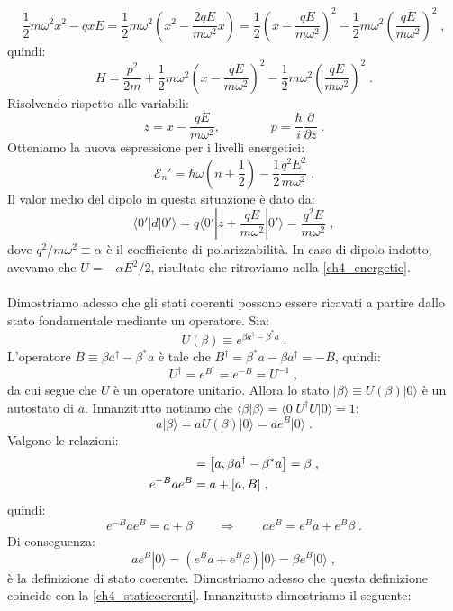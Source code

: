 \documentclass[10pt,a4paper]{report}
\theoremstyle{definition}
\numberwithin{equation}{section}
\newcommand{\bra}{\langle}
\newcommand{\ket}{\rangle}
\newcommand{\adj}[1]{#1^{\dagger}}
\begin{document}
$$
\frac{1}{2}m\omega^2 x^2-qxE=\frac{1}{2}m\omega^2\left(x^2-\frac{2qE}{m\omega^2}x\right)=\frac{1}{2}\left(x-\frac{qE}{m\omega^2}\right)^2-\frac{1}{2}m\omega^2\left(\frac{qE}{m\omega^2}\right)^2\;,
$$
quindi:
\begin{equation}
H=\frac{p^2}{2m}+\frac{1}{2}m\omega^2\left(x-\frac{qE}{m\omega^2}\right)^2-\frac{1}{2}m\omega^2\left(\frac{qE}{m\omega^2}\right)^2\;.
\end{equation}
Risolvendo rispetto alle variabili:
$$
z=x-\frac{qE}{m\omega^2},\qquad\qquad p=\frac{\hbar}{i}\frac{\partial}{\partial z}\;.
$$
Otteniamo la nuova espressione per i livelli energetici:
\begin{equation}
\mathcal{E}_n'=\hbar\omega\left(n+\frac{1}{2}\right)-\frac{1}{2}\frac{q^2E^2}{m\omega^2}\;. \label{ch4_energetic}
\end{equation}
Il valor medio del dipolo in questa situazione è dato da:
\begin{equation}
\bra 0'|d|0'\ket=q\bra 0'|z+\frac{qE}{m\omega^2}|0'\ket=\frac{q^2E}{m\omega^2}\;,
\end{equation}
dove $q^2/m\omega^2\equiv \alpha$ è il coefficiente di polarizzabilità. In caso di dipolo indotto, avevamo che $U=-\alpha E^2/2$, risultato che ritroviamo nella \eqref{ch4_energetic}. \\
\\
Dimostriamo adesso che gli stati coerenti possono essere ricavati a partire dallo stato fondamentale mediante un operatore. Sia:
\begin{equation}
U(\beta)\equiv e^{\beta\adj{a}-\beta^*a}\;.
\end{equation}
L'operatore $B\equiv \beta\adj{a}-\beta^*a$ è tale che $\adj{B}=\beta^*a-\beta\adj{a}=-B$, quindi:
$$
\adj{U}=e^{\adj{B}}=e^{-B}=U^{-1}\;,
$$
da cui segue che $U$ è un operatore unitario. Allora lo stato $|\beta\ket\equiv U(\beta)|0\ket$ è un autostato di $a$. Innanzitutto notiamo che $\bra\beta|\beta\ket=\bra 0|\adj{U}U|0\ket=1$:
$$
a|\beta\ket=aU(\beta)|0\ket=ae^B|0\ket\;.
$$
Valgono le relazioni:
\begin{align}
[a,B]&=\left[a,\beta\adj{a}-\beta^*a\right]=\beta\;, \notag \\
e^{-B}ae^B&=a+[a,B]\;,
\end{align}
quindi:
$$
e^{-B}ae^B=a+\beta \qquad \Longrightarrow \qquad ae^B=e^Ba+e^B\beta\;.
$$
Di conseguenza:
\begin{equation}
ae^B|0\ket=(e^Ba+e^B\beta)|0\ket=\beta e^B|0\ket\;,
\end{equation}
è la definizione di stato coerente. Dimostriamo adesso che questa definizione coincide con la \eqref{ch4_staticoerenti}. Innanzitutto dimostriamo il seguente:
\end{document}
